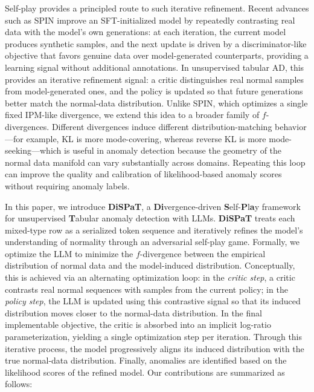 Self-play provides a principled route to such iterative refinement. Recent advances such as SPIN \citep{chen2024self} improve an SFT-initialized model by repeatedly contrasting real data with the model's own generations: at each iteration, the current model produces synthetic samples, and the next update is driven by a discriminator-like objective that favors genuine data over model-generated counterparts, providing a learning signal without additional annotations. In unsupervised tabular AD, this provides an iterative refinement signal: a critic distinguishes real normal samples from model-generated ones, and the policy is updated so that future generations better match the normal-data distribution. Unlike SPIN, which optimizes a single fixed IPM-like divergence, we extend this idea to a broader family of $f$-divergences. Different divergences induce different distribution-matching behavior---for example, KL is more mode-covering, whereas reverse KL is more mode-seeking---which is useful in anomaly detection because the geometry of the normal data manifold can vary substantially across domains. Repeating this loop can improve the quality and calibration of likelihood-based anomaly scores without requiring anomaly labels. 

In this paper, we introduce \textbf{DiSPaT}, a \textbf{Di}vergence-driven \textbf{S}elf-\textbf{P}l\textbf{a}y framework for unsupervised \textbf{T}abular anomaly detection with LLMs. \textbf{DiSPaT} treats each mixed-type row as a serialized token sequence and iteratively refines the model's understanding of normality through an adversarial self-play game. Formally, we optimize the LLM to minimize the $f$-divergence between the empirical distribution of normal data and the model-induced distribution. Conceptually, this is achieved via an alternating optimization loop: in the \textit{critic step}, a critic contrasts real normal sequences with samples from the current policy; in the \textit{policy step}, the LLM is updated using this contrastive signal so that its induced distribution moves closer to the normal-data distribution. In the final implementable objective, the critic is absorbed into an implicit log-ratio parameterization, yielding a single optimization step per iteration. Through this iterative process, the model progressively aligns its induced distribution with the true normal-data distribution. Finally, anomalies are identified based on the likelihood scores of the refined model. Our contributions are summarized as follows:



